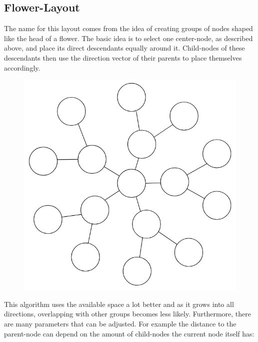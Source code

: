 \subsection{Flower-Layout}
The name for this layout comes from the idea of creating groups of nodes shaped like the head of a flower. The basic idea is to select one center-node, as described above, and place its direct descendants equally around it. Child-nodes of these descendants then use the direction vector of their parents to place themselves accordingly.

\begin{figure}[H]
\centering
\includegraphics[scale=.55]{Bilder/FlowerEx.png}
\end{figure}

This algorithm uses the available space a lot better and as it grows into all directions, overlapping with other groups becomes less likely. Furthermore, there are many parameters that can be adjusted. For example the distance to the parent-node can depend on the amount of child-nodes the current node itself has:

